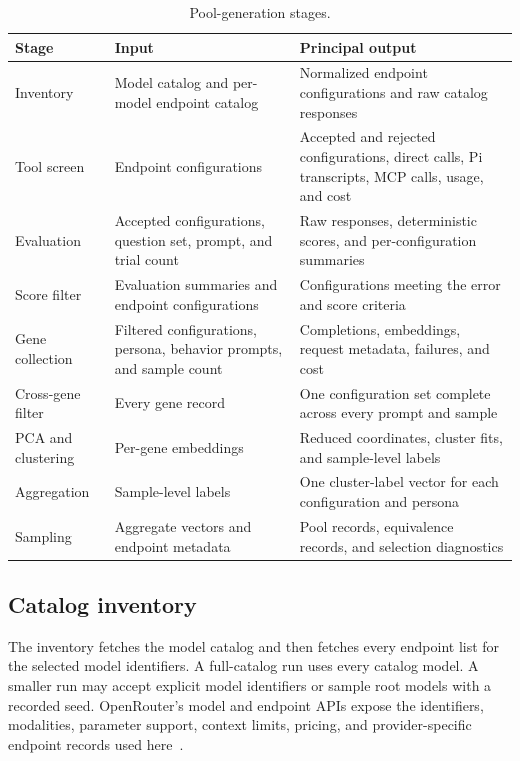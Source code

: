 \documentclass[11pt]{article}
\begin{document}
\begin{table}[htbp]
\centering
\small
\caption{Pool-generation stages.}
\label{tab:pipeline}
\begin{tabularx}{\textwidth}{@{}p{}X X@{}}
\toprule
Stage & Input & Principal output \\
\midrule
Inventory & Model catalog and per-model endpoint catalog & Normalized endpoint configurations and raw catalog responses \\
Tool screen & Endpoint configurations & Accepted and rejected configurations, direct calls, Pi transcripts, MCP calls, usage, and cost \\
Evaluation & Accepted configurations, question set, prompt, and trial count & Raw responses, deterministic scores, and per-configuration summaries \\
Score filter & Evaluation summaries and endpoint configurations & Configurations meeting the error and score criteria \\
Gene collection & Filtered configurations, persona, behavior prompts, and sample count & Completions, embeddings, request metadata, failures, and cost \\
Cross-gene filter & Every gene record & One configuration set complete across every prompt and sample \\
PCA and clustering & Per-gene embeddings & Reduced coordinates, cluster fits, and sample-level labels \\
Aggregation & Sample-level labels & One cluster-label vector for each configuration and persona \\
Sampling & Aggregate vectors and endpoint metadata & Pool records, equivalence records, and selection diagnostics \\
\bottomrule
\end{tabularx}
\end{table}

\subsection{Catalog inventory}

The inventory fetches the model catalog and then fetches every endpoint list for the selected model identifiers.  A full-catalog run uses every catalog model.  A smaller run may accept explicit model identifiers or sample root models with a recorded seed.  OpenRouter's model and endpoint APIs expose the identifiers, modalities, parameter support, context limits, pricing, and provider-specific endpoint records used here~\cite{openrouter-models,openrouter-endpoints}.
\end{document}
